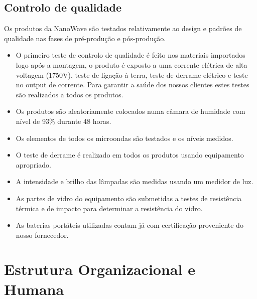 \documentclass[a4paper]{article}
\begin{document}
\subsection{Controlo de qualidade}
Os produtos da NanoWave são testados relativamente ao design e padrões de qualidade nas fases de pré-produção e pós-produção.
\begin{itemize}
    \item O primeiro teste de controlo de qualidade é feito nos materiais importados logo após a montagem, o produto é exposto a uma corrente elétrica de alta voltagem (1750V), teste de ligação à terra, teste de derrame elétrico e teste no output de corrente. Para garantir a saúde dos nossos clientes estes testes são realizados a todos os produtos.
    \item Os produtos são aleatoriamente colocados numa câmara de humidade com nível de 93\% durante 48 horas.
    \item Os elementos de todos os microondas são testados e os níveis medidos.
    \item O teste de derrame é realizado em todos os produtos usando equipamento apropriado.
    \item A intensidade e brilho das lâmpadas são medidas usando um medidor de luz.
    \item As partes de vidro do equipamento são submetidas a testes de resistência térmica e de impacto para determinar a resistência do vidro.
    \item As baterias portáteis utilizadas contam já com certificação proveniente do nosso fornecedor.
\end{itemize}

\section{Estrutura Organizacional e Humana}
\end{document}
